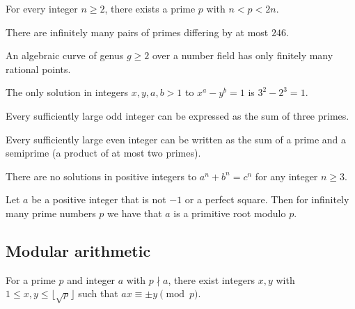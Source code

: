 \documentclass[11pt]{scrartcl}
\begin{document}
\begin{theorem}
  For every integer $n \ge 2$, there exists a prime $p$ with $n < p < 2n$.
\end{theorem}

\begin{theorem}
  There are infinitely many pairs of primes differing by at most $246$.
\end{theorem}

\begin{theorem}
  An algebraic curve of genus $g \ge 2$ over a number field
  has only finitely many rational points.
\end{theorem}

\begin{theorem}
  The only solution in integers $x, y, a, b > 1$
  to $x^a - y^b = 1$ is $3^2 - 2^3 = 1$.
\end{theorem}

\begin{theorem}
  Every sufficiently large odd integer
  can be expressed as the sum of three primes.
\end{theorem}

\begin{theorem}
  Every sufficiently large even integer
  can be written as the sum of a prime
  and a semiprime (a product of at most two primes).
\end{theorem}

\begin{theorem}
  There are no solutions in positive integers
  to $a^n + b^n = c^n$ for any integer $n \ge 3$.
\end{theorem}

\begin{theorem}
    Let $a$ be a positive integer that is not $-1$ or a perfect square.
    Then for infinitely many prime numbers $p$
    we have that $a$ is a primitive root modulo $p$.
\end{theorem}

\subsection{Modular arithmetic}
\begin{theorem}
  For a prime $p$ and integer $a$ with $p \nmid a$,
  there exist integers $x, y$ with $1 \le x, y \le \lfloor \sqrt{p} \rfloor$
  such that $ax \equiv \pm y \pmod{p}$.
\end{theorem}
\end{document}

